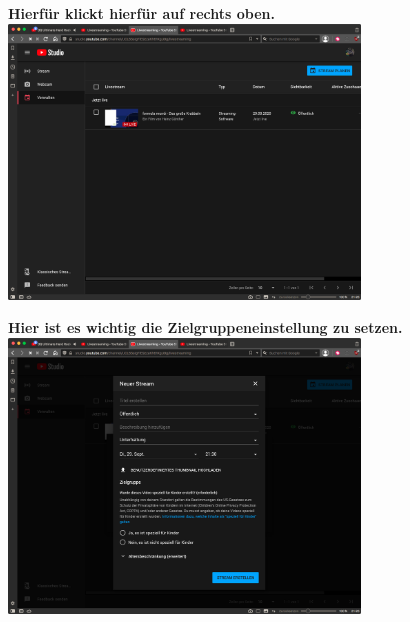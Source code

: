 \newpage
{}


{\vspace{0.2cm}}
\begin{center}
  \textbf{Hierfür klickt hierfür auf  rechts oben.} \\
  {\vspace{0.3cm}}
  \includegraphics[width=0.7\textwidth]{./pictures/YOUTUBEstreamPlanen1.png}
\end{center}



\begin{center}
  \textbf{Hier ist es wichtig die Zielgruppeneinstellung zu setzen.} \\
  {\vspace{0.3cm}}
  \includegraphics[width=0.7\textwidth]{./pictures/YOUTUBEstreamPlanen2.png}
\end{center}

